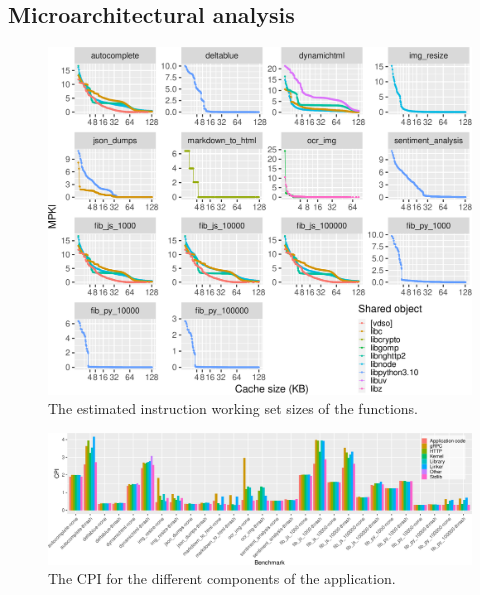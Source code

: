 \subsection{Microarchitectural analysis}
\label{wosc:subsec:topdown}

\begin{figure}
  \centering
  \includegraphics[width=\textwidth]{figures/simulated_miss_rates.pdf}
  \caption{\label{wosc:fig:code-footprint} The estimated instruction working set sizes of the functions.}
\end{figure}


\begin{figure}
  \centering
  \includegraphics[width=\textwidth]{figures/cat-cpi.pdf}
  \caption{\label{wosc:fig:cat-cpi} The CPI for the different components of the application.}
\end{figure}




